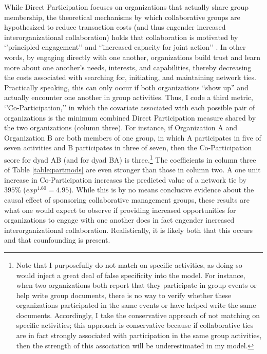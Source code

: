 \documentclass[12pt,a4paper,titlepage]{article}
\begin{document}
While Direct Participation focuses on organizations that actually share group membership, the theoretical mechanisms by which collaborative groups are hypothesized to reduce transaction costs (and thus engender increased interorganizational collaboration) holds that collaboration is motivated by ‘’principled engagement’’ and ‘’increased capacity for joint action’’ \parencite{emerson2012}. In other words, by engaging directly with one another, organizations build trust and learn more about one another’s needs, interests, and capabilities, thereby decreasing the costs associated with searching for, initiating, and maintaining network ties. Practically speaking, this can only occur if both organizations “show up” and actually encounter one another in group activities. Thus, I code a third metric, ‘’Co-Participation,’’ in which the covariate associated with each possible pair of organizations is the minimum combined Direct Participation measure shared by the two organizations (column three). For instance, if Organization A and Organization B are both members of one group, in which A participates in five of seven activities and B participates in three of seven, then the Co-Participation score for dyad AB (and for dyad BA) is three.\footnote{Note that I purposefully do not match on specific activities, as doing so would inject a great deal of false specificity into the model. For instance, when two organizations both report that they participate in group events or help write group documents, there is no way to verify whether these organizations participated in the same events or have helped write the same documents. Accordingly, I take the conservative approach of not matching on specific activities; this approach is conservative because if collaborative ties are in fact strongly associated with participation in the same group activities, then the strength of this association will be underestimated in my model.} The coefficients in column three of Table \ref{table:partmods} are even stronger than those in column two. A one unit increase in Co-Participation increases the predicted value of a network tie by $395\%$ ($exp^{1.60} = 4.95$). While this is by no means conclusive evidence about the causal effect of sponsoring collaborative management groups, these results are what one would expect to observe if providing increased opportunities for organizations to engage with one another does in fact engender increased interorganizational collaboration. Realistically, it is likely both that this occurs and that counfounding is present.
\end{document}
